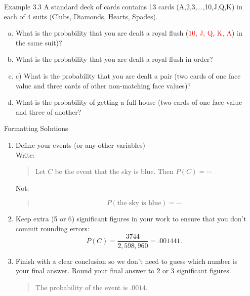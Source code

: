 \documentclass[aspectratio=169,xcolor=pdftex,dvipsnames,table]{beamer}\usepackage[]{graphicx}\usepackage[]{xcolor}
\begin{document}
\begin{frame}{Example 3.3}
  A standard deck of cards contains 13 cards (A,2,3,$\ldots$,10,J,Q,K) in each of 4 suits (Clubs, Diamonds, Hearts, Spades).

  \begin{enumerate}[a)]
  \item What is the probability that you are dealt a royal flush (\textcolor{red}{10, J, Q, K, A}) in the same suit)?
    
  \item What is the probability that you are dealt a royal flush in order?
  
  \item c) What is the probability that you are dealt a pair (two cards of one face value and three cards of other non-matching face values)?
  
  \item What is the probability of getting a full-house (two cards of one face value and three of another?
  \end{enumerate}
  
\end{frame}

\begin{frame}{Formatting Solutions}
  \begin{enumerate}
  \item Define your events (or any other variables)\\
    Write:
    \begin{quote}
      Let $C$ be the event that the sky is blue. Then $P(C)=\cdots$
    \end{quote}
    Not:
    \begin{quote}
      \[
        P(\mbox{the sky is blue})=\cdots
      \]
    \end{quote}
  \item Keep extra (5 or 6) significant figures in your work to ensure that you don't commit rounding errors:
    \[
      P(C)=\frac{3744}{2,598,960}=.001441.
    \]
    
  \item Finish with a clear conclusion so we don't need to guess which number is your final answer. Round your final answer to 2 or 3 significant figures.
    \begin{quote}
      The probability of the event is $.0014$. 
    \end{quote}
  \end{enumerate}
  
\end{frame}
\end{document}
